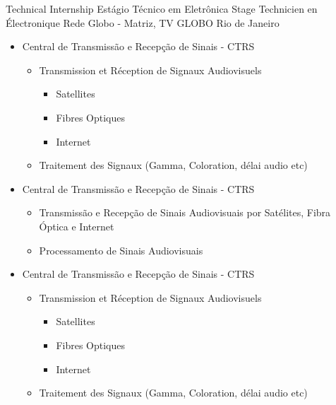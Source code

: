 \cventry{\apr\ 2013\newline \sep\ 2013\newline}
{
  \ml
  {Technical Internship}
  {Estágio Técnico em Eletrônica}
  {Stage Technicien en Électronique}}
{\newline Rede Globo - Matriz, TV GLOBO}
{Rio de Janeiro}
{\brazil}
{\ml
  {
    \begin{itemize}
    \item Central de Transmissão e Recepção de Sinais - CTRS
      \begin{itemize}
        \item Transmission et Réception de Signaux Audiovisuels
              \begin{itemize}
                \item Satellites
                \item Fibres Optiques
                \item Internet
              \end{itemize}
      \item Traitement des Signaux (Gamma, Coloration, délai audio etc)
      \end{itemize}
    \end{itemize}
  }
  {
    \begin{itemize}
    \item Central de Transmissão e Recepção de Sinais - CTRS
      \begin{itemize}
      \item Transmissão e Recepção de Sinais Audiovisuais por Satélites,
        \newline Fibra Óptica e Internet
      \item Processamento de Sinais Audiovisuais
      \end{itemize}
    \end{itemize}
  }
  {
    \begin{itemize}
    \item Central de Transmissão e Recepção de Sinais - CTRS
      \begin{itemize}
        \item Transmission et Réception de Signaux Audiovisuels
              \begin{itemize}
                \item Satellites
                \item Fibres Optiques
                \item Internet
              \end{itemize}
      \item Traitement des Signaux (Gamma, Coloration, délai audio etc)
      \end{itemize}
    \end{itemize}
  }
}
